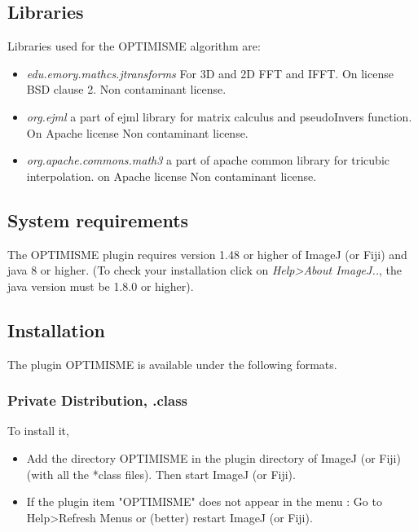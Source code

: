 \documentclass[12pt, a4paper]{scrartcl}
\begin{document}
 

\subsection{Libraries}
Libraries used for the OPTIMISME algorithm are:
\begin{itemize}
 \item \textit{edu.emory.mathcs.jtransforms }
 For 3D and 2D FFT and IFFT.  On license BSD clause 2. Non contaminant license.
 \item  \textit{org.ejml} a part of ejml library for matrix calculus and pseudoInvers function. On Apache license Non contaminant license.
 \item \textit{org.apache.commons.math3} a part of apache common library for tricubic interpolation. on Apache license Non contaminant license.
\end{itemize}

\subsection{System requirements}
The OPTIMISME plugin requires version 1.48 or higher of ImageJ (or Fiji) and java 8 or higher. (To check your installation click on \emph{Help>About ImageJ..}, the java version must be 1.8.0 or higher).

\subsection{Installation}
The plugin OPTIMISME is available under the following formats.

\subsubsection{Private Distribution, .class}
 To install it, 
  \begin{itemize}
\item Add the directory OPTIMISME in the plugin directory of ImageJ (or Fiji) (with all the *class files). Then 
 start ImageJ (or Fiji).
 
\item If the plugin item "OPTIMISME" does not appear in the menu : Go to Help>Refresh Menus or (better) restart ImageJ (or Fiji). 
\end{itemize} 
\end{document}
